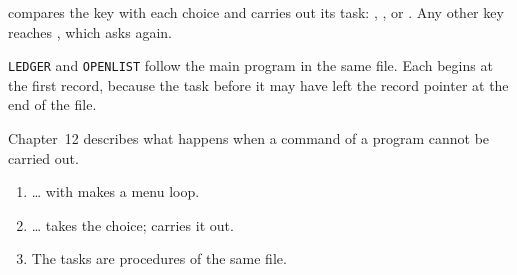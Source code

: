  compares the key with each choice and carries out
its task: , , or .  Any other key
reaches , which asks again.

\texttt{LEDGER} and \texttt{OPENLIST} follow the main
program in the same file.  Each begins at the first record, because the task
before it may have left the record pointer at the end of the file.

Chapter~12 describes what happens when a command of a program cannot be
carried out.

\begin{enumerate}
\item {} \ldots{}  with  makes a menu loop.
\item {} \ldots{}  takes the choice;  carries it out.
\item The tasks are procedures of the same file.
\end{enumerate}
